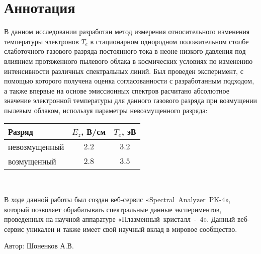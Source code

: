 \chapter*{Аннотация}

В данном исследовании разработан метод измерения относительного изменения температуры электронов $T_e$
в стационарном однородном положительном столбе слаботочного газового разряда
постоянного тока в неоне низкого давления под влиянием протяженного пылевого
облака в космических условиях по изменению интенсивности различных спектральных линий.
Был проведен эксперимент, с помощью которого получена оценка согласованности с разработанным подходом, а также
впервые на основе эмиссионных спектров расчитано абсолютное значение электронной температуры
для данного газового разряда при возмущении пылевым облаком, используя параметры невозмущенного разряда:\\[3mm]
\begin{center}
    \begin{tabular}{|l|c|c|}
    \hline
          Разряд   & $E_z$, В/см & $T_e$, эВ \\
    \hline
    невозмущенный  & $ 2.2 $     & $ 3.2 $   \\
    возмущенный    & $ 2.8 $     & $ 3.5 $   \\
    \hline
    \end{tabular}\\[10mm]
\end{center}

В ходе данной работы был создан веб-сервис «Spectral~Analyzer~PK-4», который позволяет обрабатывать
спектральные данные экспериментов, проведенных на научной аппаратуре «Плазменный~кристалл~-~4». Данный веб-сервис
уникален и также имеет свой научный вклад в мировое сообщество.

\vfill
\vfill
\begin{minipage}{.49\textwidth}\end{minipage}
\hfill
\begin{minipage}{.49\textwidth}
    Автор: \uline{\hfill} Шоненков А.В.
\end{minipage}
\vfill
